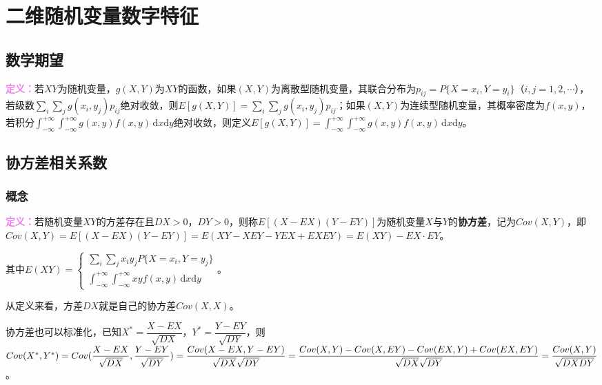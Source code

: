 \documentclass[UTF8, 12pt]{ctexart}
\begin{document}
\section{二维随机变量数字特征}

\subsection{数学期望}

\textcolor{violet}{\textbf{定义：}}若$XY$为随机变量，$g(X,Y)$为$XY$的函数，如果$(X,Y)$为离散型随机变量，其联合分布为$p_{ij}=P\{X=x_i,Y=y_i\}$（$i,j=1,2,\cdots$），若级数$\sum\limits_i\sum\limits_jg(x_i,y_j)p_{ij}$绝对收敛，则$E[g(X,Y)]=\sum\limits_i\sum\limits_jg(x_i,y_j)p_{ij}$；如果$(X,Y)$为连续型随机变量，其概率密度为$f(x,y)$，若积分$\int_{-\infty}^{+\infty}\int_{-\infty}^{+\infty}g(x,y)f(x,y)\,\textrm{d}x\textrm{d}y$绝对收敛，则定义$E[g(X,Y)]=\int_{-\infty}^{+\infty}\int_{-\infty}^{+\infty}g(x,y)f(x,y)\,\textrm{d}x\textrm{d}y$。

\subsection{协方差相关系数}

\subsubsection{概念}

\textcolor{violet}{\textbf{定义：}}若随机变量$XY$的方差存在且$DX>0$，$DY>0$，则称$E[(X-EX)(Y-EY)]$为随机变量$X$与$Y$的\textbf{协方差}，记为$Cov(X,Y)$，即$Cov(X,Y)=E[(X-EX)(Y-EY)]=E(XY-XEY-YEX+EXEY)=E(XY)-EX\cdot EY$。

其中$E(XY)=\left\{\begin{array}{l}
    \sum\limits_i\sum\limits_jx_iy_jP\{X=x_i,Y=y_j\} \\
    \int_{-\infty}^{+\infty}\int_{-\infty}^{+\infty}xyf(x,y)\,\textrm{d}x\textrm{d}y
\end{array}\right.$。

从定义来看，方差$DX$就是自己的协方差$Cov(X,X)$。

协方差也可以标准化，已知$X^*=\dfrac{X-EX}{\sqrt{DX}}$，$Y^*=\dfrac{Y-EY}{\sqrt{DY}}$，则$Cov(X^*,Y^*)\\=Cov(\dfrac{X-EX}{\sqrt{DX}},\dfrac{Y-EY}{\sqrt{DY}})=\dfrac{Cov(X-EX,Y-EY)}{\sqrt{DX}\sqrt{DY}}\\=\dfrac{Cov(X,Y)-Cov(X,EY)-Cov(EX,Y)+Cov(EX,EY)}{\sqrt{DX}\sqrt{DY}}=\dfrac{Cov(X,Y)}{\sqrt{DXDY}}$。
\end{document}
